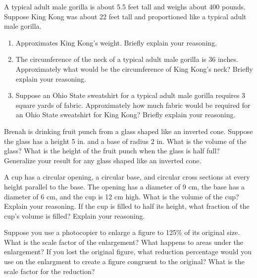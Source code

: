\begin{prob}
A typical adult male gorilla is about 5.5 feet tall and weighs about 400 pounds. Suppose King Kong was about 22 feet tall and proportioned like a typical adult male gorilla.
\begin{enumerate}
\item Approximates King Kong's weight. Briefly explain your reasoning.
\item The circumference of the neck of a typical adult male gorilla is 36 inches. Approximately what would be the circumference of King Kong's neck? Briefly explain your reasoning.
\item Suppose an Ohio State sweatshirt for a typical adult male gorilla requires 3 square yards of fabric.  Approximately how much fabric would be required for an Ohio State sweatshirt for King Kong?  Briefly explain your reasoning.
\end{enumerate}
\end{prob}

\begin{prob}
Brenah is drinking fruit punch from a glass shaped like an inverted cone.  Suppose the glass has a height 5 in. and a base of radius 2 in.  What is the volume of the glass?  What is the height of the fruit punch when the glass is half full?  Generalize your result for any glass shaped like an inverted cone.  
\end{prob}

\begin{prob}
A cup has a circular opening, a circular base, and circular cross sections at every height parallel to the base.  The opening has a diameter of 9 cm, the base has a diameter of 6 cm, and the cup is 12 cm high.  
What is the volume of the cup?  Explain your reasoning.  
If the cup is filled to half its height, what fraction of the cup's volume is filled?  Explain your reasoning.  
\end{prob}

\begin{prob}
Suppose you use a photocopier to enlarge a figure to 125\% of its original size.  What is the scale factor of the enlargement?  What happens to areas under the enlargement?  If you lost the original figure, what reduction percentage would you use on the enlargment to create a figure congruent to the original?  What is the scale factor for the reduction?  
\end{prob}

